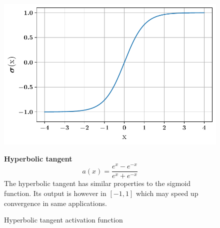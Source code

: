\begin{figure}[!h]
\begin{minipage}{0.45\textwidth}
    \centering
\includegraphics[width=\textwidth]{images/networks/act_tanh.pdf}
\caption{Hyperbolic tangent activation function}
    \label{fig:act_tanh}
\end{minipage}
\hfill
\begin{minipage}{0.5\textwidth}
    \textbf{Hyperbolic tangent}
   \begin{equation}
       a(x) =\frac{e^x-e^{-x}}{e^x+e^{-x}}
   \end{equation}
The hyperbolic tangent has similar properties to the sigmoid function. Its output is however in $[-1,1]$ which may speed up convergence in same applications.
\end{minipage}
\end{figure}